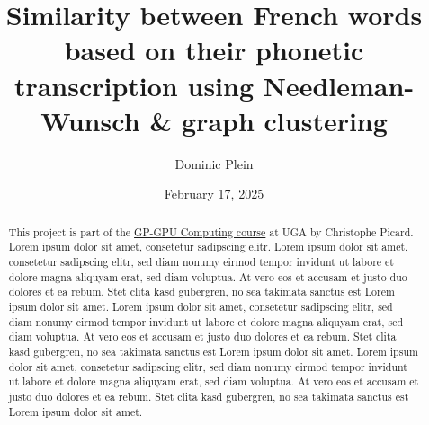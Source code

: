 \documentclass[10pt,a4paper,english]{article}
\title{Similarity between French words based on their phonetic transcription using Needleman-Wunsch \& graph clustering}
\author{Dominic Plein}
\date{February 17, 2025}
\newcommand{\abstractText}{\noindent
	\newline\noindent
	This project is part of the \href{https://membres-ljk.imag.fr/Christophe.Picard/teaching/gp-gpu}{GP-GPU Computing course} at UGA by Christophe Picard.
    Lorem ipsum dolor sit amet, consetetur sadipscing elitr.
    Lorem ipsum dolor sit amet, consetetur sadipscing elitr, sed diam nonumy eirmod tempor invidunt ut labore et dolore magna aliquyam erat, sed diam voluptua. At vero eos et accusam et justo duo dolores et ea rebum. Stet clita kasd gubergren, no sea takimata sanctus est Lorem ipsum dolor sit amet. Lorem ipsum dolor sit amet, consetetur sadipscing elitr, sed diam nonumy eirmod tempor invidunt ut labore et dolore magna aliquyam erat, sed diam voluptua. At vero eos et accusam et justo duo dolores et ea rebum. Stet clita kasd gubergren, no sea takimata sanctus est Lorem ipsum dolor sit amet. Lorem ipsum dolor sit amet, consetetur sadipscing elitr, sed diam nonumy eirmod tempor invidunt ut labore et dolore magna aliquyam erat, sed diam voluptua. At vero eos et accusam et justo duo dolores et ea rebum. Stet clita kasd gubergren, no sea takimata sanctus est Lorem ipsum dolor sit amet.
}
\begin{document}
\setlength{\abovedisplayskip}{0.2em}

\maketitle
\begin{abstract}
    \abstractText
    \newline
    \newline
\end{abstract}



\begin{multicols*}{2}
\tableofcontents

\newcolumn



\vfill\null
\pagebreak


\end{multicols*}

\printglossary[type=\acronymtype]
\end{document}
